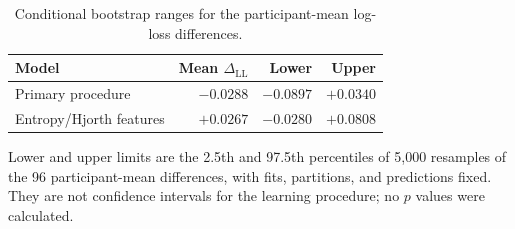 \begin{table}[!htbp]
\centering\small
\caption{Conditional bootstrap ranges for the participant-mean log-loss differences.}
\label{tab:fixed-oof}
\setlength{\tabcolsep}{4pt}\renewcommand{\arraystretch}{1.14}
\begin{tabularx}{\textwidth}{@{}>{\raggedright\arraybackslash}Xrrr@{}}
\toprule
Model & Mean $\Delta_{\mathrm{LL}}$ & Lower & Upper\\\midrule
Primary procedure & $-0.0288$ & $-0.0897$ & $+0.0340$\\
Entropy/Hjorth features & $+0.0267$ & $-0.0280$ & $+0.0808$\\
\bottomrule\end{tabularx}
\par\smallskip\begin{minipage}{\textwidth}\footnotesize Lower and upper limits are the 2.5th and 97.5th percentiles of 5,000 resamples of the 96 participant-mean differences, with fits, partitions, and predictions fixed. They are not confidence intervals for the learning procedure; no $p$ values were calculated.\end{minipage}
\end{table}

